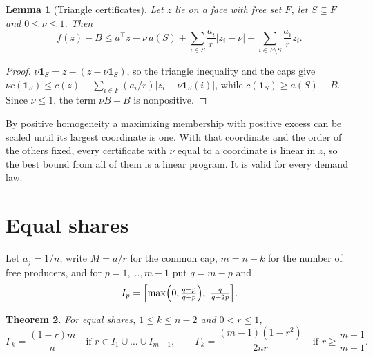 \documentclass[11pt,a4paper]{article}
\newtheorem{theorem}{Theorem}
\newtheorem{lemma}[theorem]{Lemma}
\theoremstyle{remark}
\newcommand{\one}{\mathbf 1}
\begin{document}
\begin{lemma}[Triangle certificates]\label{lem:certificates}
Let $z$ lie on a face with free set $F$, let $S\subseteq F$ and $0\le\nu\le1$.
Then
\[
f(z)-B\le a^\top z-\nu\,a(S)+\sum_{i\in S}\frac{a_i}{r}|z_i-\nu|
+\sum_{i\in F\setminus S}\frac{a_i}{r}z_i .
\]
\end{lemma}

\begin{proof}
$\nu\one_S=z-(z-\nu\one_S)$, so the triangle inequality and the caps give
$\nu c(\one_S)\le c(z)+\sum_{i\in F}(a_i/r)|z_i-\nu\one_S(i)|$, while
$c(\one_S)\ge a(S)-B$. Since $\nu\le1$, the term $\nu B-B$ is nonpositive.
\end{proof}

By positive homogeneity a maximizing membership with positive excess can be
scaled until its largest coordinate is one. With that coordinate and the order
of the others fixed, every certificate with $\nu$ equal to a coordinate is
linear in $z$, so the best bound from all of them is a linear program. It is
valid for every demand law.

\section{Equal shares}

Let $a_j=1/n$, write $M=a/r$ for the common cap, $m=n-k$ for the number of
free producers, and for $p=1,\dots,m-1$ put $q=m-p$ and
\[
I_p=\Bigl[\max\Bigl(0,\tfrac{q-p}{q+p}\Bigr),\ \tfrac{q}{q+2p}\Bigr].
\]

\begin{theorem}\label{thm:equal}
For equal shares, $1\le k\le n-2$ and $0<r\le1$,
\[
\Gamma_k=\frac{(1-r)m}{n}\quad\text{if } r\in I_1\cup\dots\cup I_{m-1},
\qquad
\Gamma_k=\frac{(m-1)(1-r^2)}{2nr}\quad\text{if } r\ge\frac{m-1}{m+1}.
\]
\end{theorem}
\end{document}
